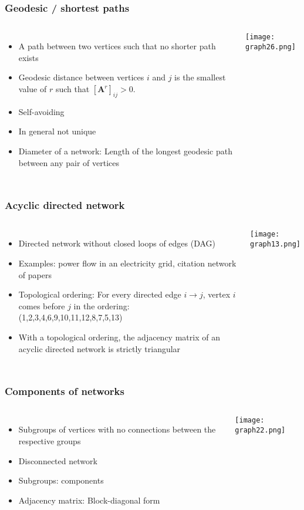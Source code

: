 \documentclass[10pt,aspectratio=169,dvipsnames]{beamer}
\let\olditem\item
\renewcommand{\item}{%
\olditem\vspace{5pt}}
\begin{document}
\begin{frame}
\frametitle{Geodesic / shortest paths}
\begin{columns}
\begin{itemize}
\item A path between two vertices such that no shorter path exists
\item Geodesic distance between vertices $i$ and $j$ is the smallest value of $r$ such that
$\left[\mathbf{A}^{r}\right]_{ij}>0$.
\item Self-avoiding
\item In general not unique
\item \alert{Diameter} of a network: Length of the longest geodesic path between any pair of vertices
\end{itemize}
\texttt{[image: graph26.png]}
\end{columns}
\end{frame}

\begin{frame}
\frametitle{Acyclic directed network}
\begin{columns}
\begin{itemize}
\item Directed network without closed loops of edges (DAG)
\item Examples: power flow in an electricity grid, citation network of papers
\item Topological ordering: For every directed edge $i\to j$, vertex $i$ comes before $j$ in the ordering:\\(1,2,3,4,6,9,10,11,12,8,7,5,13)
\item With a topological ordering, the adjacency matrix of an acyclic directed network is \alert{strictly triangular}
\end{itemize}
\texttt{[image: graph13.png]}
\end{columns}
\end{frame}
\begin{frame}
\frametitle{Components of networks}
\begin{columns}
\begin{itemize}
\item Subgroups of vertices with no connections between the respective groups
\item \alert{Disconnected} network
\item Subgroups: \alert{components}
\item Adjacency matrix: Block-diagonal form
\end{itemize}
\texttt{[image: graph22.png]}\end{columns}
\end{frame}
\end{document}
